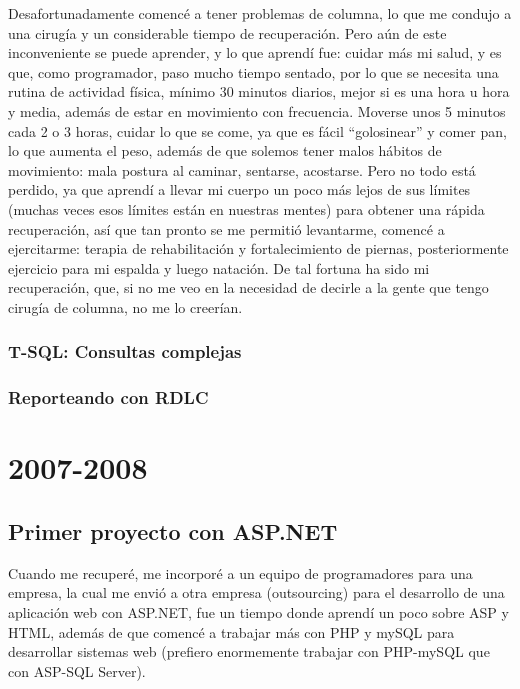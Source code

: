 \documentclass[12pt,spanish,lettersize]{book}
\begin{document}
Desafortunadamente comencé a tener problemas de columna, lo que me condujo a una cirugía y un considerable tiempo de recuperación. Pero aún de este inconveniente se puede aprender, y lo que aprendí fue: cuidar más mi salud, y es que, como programador, paso mucho tiempo sentado, por lo que se necesita una rutina de actividad física, mínimo 30 minutos diarios, mejor si es una hora u hora y media, además de estar en movimiento con frecuencia. Moverse unos 5 minutos cada 2 o 3 horas, cuidar lo que se come, ya que es fácil “golosinear” y comer pan, lo que aumenta el peso, además de que solemos tener malos hábitos de movimiento: mala postura al caminar, sentarse, acostarse. Pero no todo está perdido, ya que aprendí a llevar mi cuerpo un poco más lejos de sus límites (muchas veces esos límites están en nuestras mentes) para obtener una rápida recuperación, así que tan pronto se me permitió levantarme, comencé a ejercitarme: terapia de rehabilitación y fortalecimiento de piernas, posteriormente ejercicio para mi espalda y luego natación. De tal fortuna ha sido mi recuperación, que, si no me veo en la necesidad de decirle a la gente que tengo cirugía de columna, no me lo creerían.\\
\subsection{T-SQL: Consultas complejas}
\subsection{Reporteando con RDLC}
\chapter{2007-2008}

\section{Primer proyecto con ASP.NET}

Cuando me recuperé, me incorporé a un equipo de programadores para una empresa, la cual me envió a otra empresa (outsourcing) para el desarrollo de una aplicación web con ASP.NET, fue un tiempo donde aprendí un poco sobre ASP y HTML, además de que comencé a trabajar más con PHP y mySQL para desarrollar sistemas web (prefiero enormemente trabajar con PHP-mySQL que con ASP-SQL Server).\\
\end{document}
